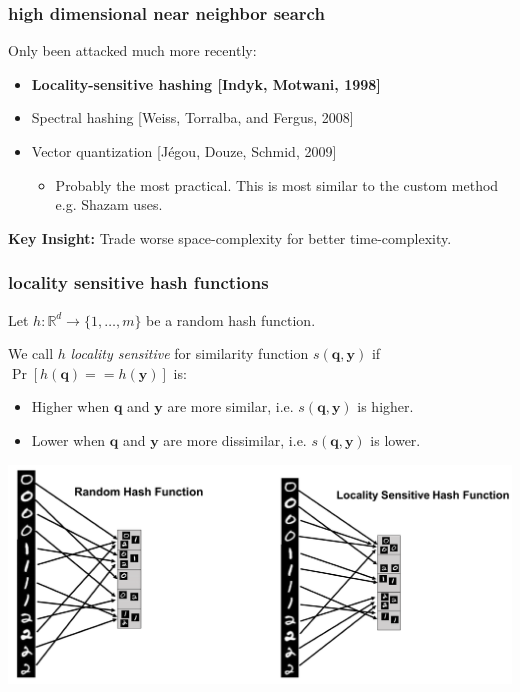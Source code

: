 \documentclass[compress]{beamer}
\newcommand{\bv}[1]{\mathbf{#1}}
\newcommand{\R}{\mathbb{R}}
\begin{document}
\begin{frame}
	\frametitle{high dimensional near neighbor search}	
	Only been attacked much more recently:
	\begin{itemize}
		\item \textbf{\alert{Locality-sensitive hashing [Indyk, Motwani, 1998]}}
		\item Spectral hashing [Weiss, Torralba, and Fergus, 2008]
		\item Vector quantization [J\'{e}gou, Douze, Schmid, 2009]
		\begin{itemize}
			\item Probably the most practical. This is most similar to the custom method e.g. Shazam uses.
		\end{itemize}
	\end{itemize}

\textbf{Key Insight:} Trade worse space-complexity for better time-complexity. 
\end{frame}

\begin{frame}
	\frametitle{locality sensitive hash functions}
	Let $h: \R^d \rightarrow \{1, \ldots, m\}$ be a random hash function. 
	
	We call $h$ \emph{locality sensitive} for similarity function $s(\bv{q},\bv{y})$ if $\Pr\left[h(\bv{q}) == h(\bv{y})\right]$ is:
	\begin{itemize}
		\item Higher when $\bv{q}$ and $\bv{y}$ are more similar, i.e. $s(\bv{q},\bv{y})$ is higher.
		\item Lower when $\bv{q}$ and $\bv{y}$ are more dissimilar, i.e. $s(\bv{q},\bv{y})$ is lower. 
	\end{itemize}
\begin{center}
	\includegraphics[width=.9\textwidth]{cam_lsh.png}
\end{center}
\end{frame}
\end{document}
